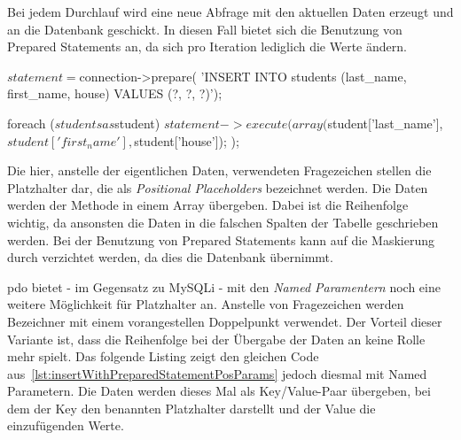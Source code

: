 \begin{listing}[H]
\caption{}
\label{lst:insertWithoutPreparedStatement}
\end{listing}

Bei jedem Durchlauf wird eine neue Abfrage mit den aktuellen Daten erzeugt und an die Datenbank geschickt. In diesen Fall bietet sich die Benutzung von Prepared Statements an, da sich pro Iteration lediglich die Werte ändern.

\begin{listing}[H]
\begin{phpcode}
$statement = $connection->prepare(
  'INSERT INTO students (last_name, first_name, house)
    VALUES (?, ?, ?)');

foreach ($students as $student) {
	$statement->execute(
	  array(
	    $student['last_name'],
	    $student['first_name'],
	    $student['house']);
	);
}
\end{phpcode}
\caption{}
\label{lst:insertWithPreparedStatementPosParams}
\end{listing}

Die hier, anstelle der eigentlichen Daten, verwendeten Fragezeichen stellen die Platzhalter dar, die als \textit{Positional Placeholders} bezeichnet werden. Die Daten werden der Methode  in einem Array übergeben. Dabei ist die Reihenfolge wichtig, da ansonsten die Daten in die falschen Spalten der Tabelle geschrieben werden. Bei der Benutzung von Prepared Statements kann auf die Maskierung durch  verzichtet werden, da dies die Datenbank übernimmt.

\gls{pdo} bietet - im Gegensatz zu MySQLi - mit den \textit{Named Paramentern} noch eine weitere Möglichkeit für Platzhalter an. Anstelle von Fragezeichen werden Bezeichner mit einem vorangestellen Doppelpunkt verwendet. Der Vorteil dieser Variante ist, dass die Reihenfolge bei der Übergabe der Daten an  keine Rolle mehr spielt. Das folgende Listing zeigt den gleichen Code aus~\ref{lst:insertWithPreparedStatementPosParams} jedoch diesmal mit Named Parametern. Die Daten werden dieses Mal als Key/Value-Paar übergeben, bei dem der Key den benannten Platzhalter darstellt und der Value die einzufügenden Werte.

